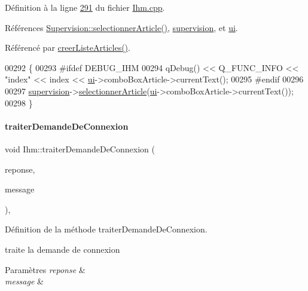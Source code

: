 Définition à la ligne \hyperlink{_ihm_8cpp_source_l00291}{291} du fichier \hyperlink{_ihm_8cpp_source}{Ihm.\+cpp}.



Références \hyperlink{_supervision_8cpp_source_l00320}{Supervision\+::selectionner\+Article()}, \hyperlink{_ihm_8h_source_l00100}{supervision}, et \hyperlink{_ihm_8h_source_l00099}{ui}.



Référencé par \hyperlink{_ihm_8cpp_source_l00367}{creer\+Liste\+Articles()}.


\begin{DoxyCode}
00292 \{
00293 \textcolor{preprocessor}{    #ifdef DEBUG\_IHM}
00294         qDebug() << Q\_FUNC\_INFO << \textcolor{stringliteral}{"index"} << index << \hyperlink{class_ihm_a0ac5f47856566ceeeca1720109bf70ea}{ui}->comboBoxArticle->currentText();
00295 \textcolor{preprocessor}{    #endif}
00296 
00297     \hyperlink{class_ihm_a454ab89ced1b27fcb42d550e443e780c}{supervision}->\hyperlink{class_supervision_a2efb7e4dabe2664c9cfd41d703b6250c}{selectionnerArticle}(\hyperlink{class_ihm_a0ac5f47856566ceeeca1720109bf70ea}{ui}->comboBoxArticle->currentText());
00298 \}
\end{DoxyCode}
\mbox{\label{class_ihm_a70f9dcc2df7d4d05ab43a809efeeeb06}} 
\paragraph{\texorpdfstring{traiter\+Demande\+De\+Connexion}{traiterDemandeDeConnexion}}
{\footnotesize\ttfamily void Ihm\+::traiter\+Demande\+De\+Connexion (\begin{DoxyParamCaption}\item[{bool}]{reponse,  }\item[{Q\+String}]{message }\end{DoxyParamCaption})\hspace{0.3cm}{\ttfamily [private]}, {\ttfamily [slot]}}



Définition de la méthode traiter\+Demande\+De\+Connexion. 

traite la demande de connexion 
\begin{DoxyParams}{Paramètres}
{\em reponse} & \\
\hline
{\em message} & \\
\hline
\end{DoxyParams}


